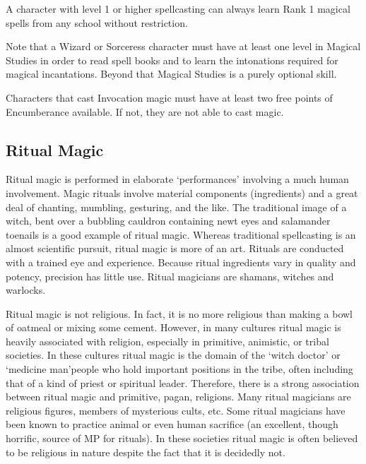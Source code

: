 \documentclass[twoside]{book}
\begin{document}
    {  
      A character with level 1 or higher spellcasting can
               always learn Rank 1 magical spells from any school without
               restriction. 
    }
  
    {  
      Note that a Wizard or Sorceress character must have
               at least one level in Magical Studies in order to read
               spell books and to learn the intonations required for
               magical incantations. Beyond that Magical Studies is a
               purely optional skill. 
    }
  
    {  
      Characters that cast Invocation magic must have at
               least two free points of Encumberance available. If not,
               they are not able to cast magic. 
    }
  
    

\subsection{Ritual Magic}
    
    {  
      Ritual magic is performed in elaborate
               `performances' involving a much human
               involvement. Magic rituals involve material components
               (ingredients) and a great deal of chanting, mumbling,
               gesturing, and the like. The traditional image of a witch,
               bent over a bubbling cauldron containing newt eyes and
               salamander toenails is a good example of ritual magic.
               Whereas traditional spellcasting is an almost scientific
               pursuit, ritual magic is more of an art. Rituals are
               conducted with a trained eye and experience. Because
               ritual ingredients vary in quality and potency, precision
               has little use. Ritual magicians are shamans, witches and
               warlocks. 
    }
  
    {  
      Ritual magic is not religious. In fact, it is no
               more religious than making a bowl of oatmeal or mixing
               some cement. However, in many cultures ritual magic is
               heavily associated with religion, especially in primitive,
               animistic, or tribal societies. In these cultures ritual
               magic is the domain of the `witch doctor' or
               `medicine man'people who hold important
               positions in the tribe, often including that of a kind of
               priest or spiritual leader. Therefore, there is a strong
               association between ritual magic and primitive, pagan,
               religions. Many ritual magicians are religious figures,
               members of mysterious cults, etc. Some ritual magicians
               have been known to practice animal or even human sacrifice
               (an excellent, though horrific, source of MP for rituals).
               In these societies ritual magic is often believed to be
               religious in nature despite the fact that it is decidedly
               not. 
    }
  
\end{document}
